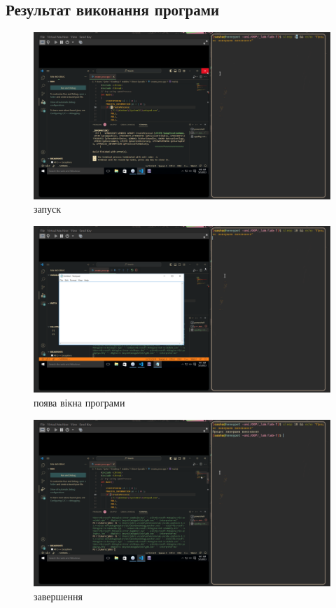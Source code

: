 \documentclass[a4paper, 12pt, oneside]{extarticle}
\begin{document}
\subsection*{Результат виконання програми}
\begin{figure}[h]
	\includegraphics[width=\textwidth]{images/1}
	\caption{запуск}
\end{figure}
\begin{figure}[h]
	\includegraphics[width=\textwidth]{images/2}
	\caption{поява вікна програми}
\end{figure}
\begin{figure}[h]
	\includegraphics[width=\textwidth]{images/3}
	\caption{завершення}
\end{figure}
\clearpage
\end{document}
